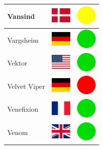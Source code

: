 \documentclass[12pt, a4paper, twoside]{report}
\begin{document}
\begin{center}
\begin{longtable}{|p{5cm}|p{2cm}|p{2cm}|}
 Vansind                                                    & \includegraphics[width=1cm]{../img/flags/dk} &   \includegraphics[width=1cm]{../likes/m} \\ \hline
 Vargsheim                                                  & \includegraphics[width=1cm]{../img/flags/de} &   \includegraphics[width=1cm]{../likes/y} \\ \hline
 Vektor                                                     & \includegraphics[width=1cm]{../img/flags/us} &   \includegraphics[width=1cm]{../likes/y} \\ \hline
 Velvet Viper                                               & \includegraphics[width=1cm]{../img/flags/de} &   \includegraphics[width=1cm]{../likes/n} \\ \hline
 Venefixion                                                 & \includegraphics[width=1cm]{../img/flags/fr} &   \includegraphics[width=1cm]{../likes/y} \\ \hline
 Venom                                                      & \includegraphics[width=1cm]{../img/flags/gb} &   \includegraphics[width=1cm]{../likes/y} \\ \hline

\end{longtable}
\end{center}
\end{document}
